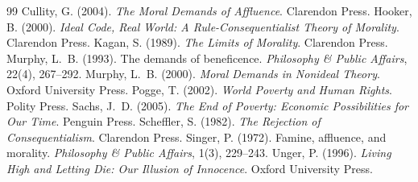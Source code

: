 \documentclass{situationist-preprint}
\begin{document}
\begin{thebibliography}{99}\small
{} Cullity, G. (2004). \emph{The Moral Demands of Affluence}. Clarendon Press.
 Hooker, B. (2000). \emph{Ideal Code, Real World: A Rule-Consequentialist Theory of Morality}. Clarendon Press.
 Kagan, S. (1989). \emph{The Limits of Morality}. Clarendon Press.
 Murphy, L.~B. (1993). The demands of beneficence. \emph{Philosophy \& Public Affairs}, 22(4), 267--292.
 Murphy, L.~B. (2000). \emph{Moral Demands in Nonideal Theory}. Oxford University Press.
 Pogge, T. (2002). \emph{World Poverty and Human Rights}. Polity Press.
 Sachs, J.~D. (2005). \emph{The End of Poverty: Economic Possibilities for Our Time}. Penguin Press.
 Scheffler, S. (1982). \emph{The Rejection of Consequentialism}. Clarendon Press.
 Singer, P. (1972). Famine, affluence, and morality. \emph{Philosophy \& Public Affairs}, 1(3), 229--243.
 Unger, P. (1996). \emph{Living High and Letting Die: Our Illusion of Innocence}. Oxford University Press.
\end{thebibliography}
\end{document}
